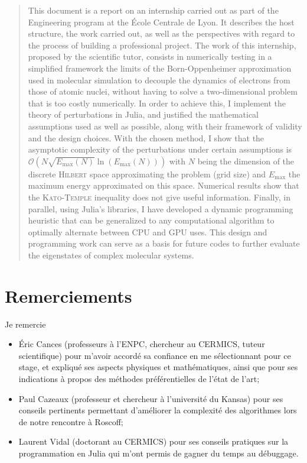\documentclass[svgnames,dvipsnames,a4paper,10pt,french]{report}
\begin{document}
\begin{abstract}
  This document is a report on an internship carried out as part of the  Engineering program at the École Centrale de Lyon. It describes the host structure, the work carried out, as well as the perspectives with regard to the process of building a professional project. The work of this internship, proposed by the scientific tutor, consists in numerically testing in a simplified framework the limits of the Born-Oppenheimer approximation used in molecular simulation to decouple the dynamics of electrons from those of atomic nuclei, without having to solve a two-dimensional problem that is too costly numerically. 
  In order to achieve this, I implement the theory of perturbations in Julia, and justified the mathematical assumptions used as well as possible, along with their framework of validity and the design choices. With the chosen method, I show that the asymptotic complexity of the perturbations under certain assumptions is $\mathcal{O}\left(N \sqrt{E_\text{max}(N)} \ln(E_\text{max}(N)) \right)$ with $N$ being the dimension of the discrete \textsc{Hilbert} space approximating the problem (grid size) and $E_\text{max}$ the maximum energy approximated on this space. Numerical results show that the \textsc{Kato-Temple} inequality does not give useful information. Finally, in parallel, using Julia's libraries, I have developed a dynamic programming heuristic that can be generalized to any computational algorithm to optimally alternate between CPU and GPU uses. This design and programming work can serve as a basis for future codes to further evaluate the eigenstates of complex molecular systems.



\end{abstract}

\section*{Remerciements}
Je remercie
\begin{itemize}
    \item Éric Cances (professeurs à l'ENPC, chercheur au CERMICS, tuteur scientifique) pour m'avoir accordé sa confiance en me sélectionnant pour ce stage, et expliqué ses aspects physiques et mathématiques, ainsi que pour ses indications à propos des méthodes préférentielles de l'état de l'art;
    \item Paul Cazeaux (professeur et chercheur à l'université du Kansas) pour ses conseils pertinents permettant d'améliorer la complexité des algorithmes lors de notre rencontre à Roscoff;
    \item Laurent Vidal (doctorant au CERMICS) pour ses conseils pratiques sur la programmation en Julia qui m'ont permis de gagner du temps au débuggage.
\end{itemize}
\end{document}
